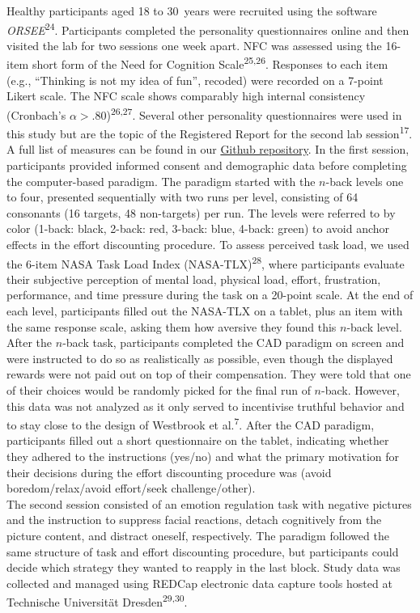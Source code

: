 \documentclass[
  man,floatsintext]{apa6}
\begin{document}
Healthy participants aged 18 to 30~years were recruited using the software \emph{ORSEE}\textsuperscript{24}.
Participants completed the personality questionnaires online and then visited the lab for two sessions one week apart.
NFC was assessed using the 16-item short form of the Need for Cognition Scale\textsuperscript{25,26}.
Responses to each item (e.g., ``Thinking is not my idea of fun'', recoded) were recorded on a 7-point Likert scale.
The NFC scale shows comparably high internal consistency (Cronbach's \(\alpha>.80\))\textsuperscript{26,27}.
Several other personality questionnaires were used in this study but are the topic of the Registered Report for the second lab session\textsuperscript{17}.
A full list of measures can be found in our \href{https://github.com/ChScheffel/CAD}{Github repository}.
In the first session, participants provided informed consent and demographic data before completing the computer-based paradigm.
The paradigm started with the \(n\)-back levels one to four, presented sequentially with two runs per level, consisting of 64 consonants (16 targets, 48 non-targets) per run.
The levels were referred to by color (1-back: black, 2-back: red, 3-back: blue, 4-back: green) to avoid anchor effects in the effort discounting procedure.
To assess perceived task load, we used the 6-item NASA Task Load Index (NASA-TLX)\textsuperscript{28}, where participants evaluate their subjective perception of mental load, physical load, effort, frustration, performance, and time pressure during the task on a 20-point scale.
At the end of each level, participants filled out the NASA-TLX on a tablet, plus an item with the same response scale, asking them how aversive they found this \(n\)-back level.
After the \(n\)-back task, participants completed the CAD paradigm on screen and were instructed to do so as realistically as possible, even though the displayed rewards were not paid out on top of their compensation.
They were told that one of their choices would be randomly picked for the final run of \(n\)-back.
However, this data was not analyzed as it only served to incentivise truthful behavior and to stay close to the design of Westbrook et al.\textsuperscript{7}.
After the CAD paradigm, participants filled out a short questionnaire on the tablet, indicating whether they adhered to the instructions (yes/no) and what the primary motivation for their decisions during the effort discounting procedure was (avoid boredom/relax/avoid effort/seek challenge/other).\\
The second session consisted of an emotion regulation task with negative pictures and the instruction to suppress facial reactions, detach cognitively from the picture content, and distract oneself, respectively.
The paradigm followed the same structure of task and effort discounting procedure, but participants could decide which strategy they wanted to reapply in the last block.
Study data was collected and managed using REDCap electronic data capture tools hosted at Technische Universität Dresden\textsuperscript{29,30}.
\end{document}
